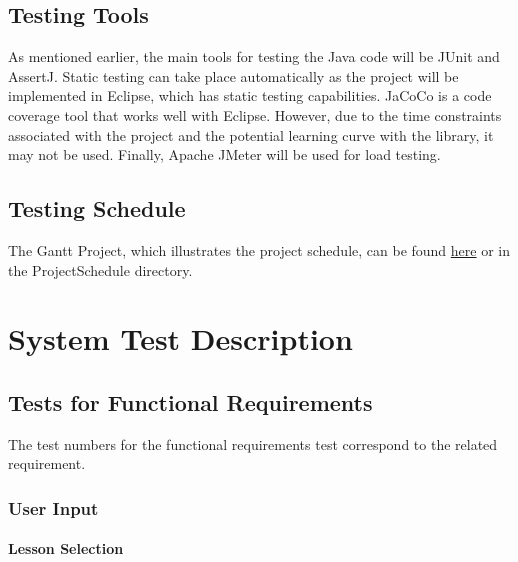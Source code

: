 \documentclass[12pt, titlepage]{article}
\begin{document}
\subsection{Testing Tools}
\label{sec:tt}

	As mentioned earlier, {\color{cyan}the main tools for testing the Java code will be JUnit and AssertJ}. Static testing can take place automatically as the project will be implemented in Eclipse, which has static testing capabilities. JaCoCo is a code coverage tool that works well with Eclipse. However, due to the time constraints associated with the project and the potential learning curve with the library, it may not be used. Finally, Apache JMeter will be used for load testing.

\subsection{Testing Schedule}
\label{sec:ts}
		
The Gantt Project, which illustrates the project schedule, can be found \href{run:../../ProjectSchedule/Gantt_Project.gan}{here} or in the ProjectSchedule directory. 

\section{System Test Description}
	
\subsection{Tests for Functional Requirements}
The test numbers for the functional requirements test correspond to the related requirement.
\subsubsection{User Input}
		
\paragraph{Lesson Selection}
\end{document}
